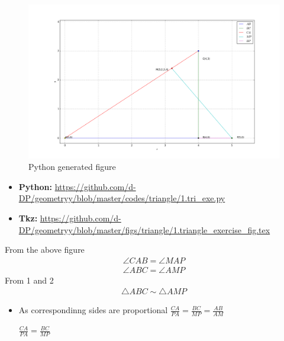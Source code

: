 \begin{frame}
\begin{figure}[!ht]
\resizebox{.5\linewidth}{!}
{

\includegraphics[scale=1.2]{./figs/triangle/tri.png}
}
\caption{Python generated figure}
\label{fig:foo}
\end{figure}
\begin{itemize}
\item \textbf{Python:} \url{https://github.com/d-DP/geometryy/blob/master/codes/triangle/1.tri_exe.py}
\item \textbf{Tkz:} \url{https://github.com/d-DP/geometryy/blob/master/figs/triangle/1.triangle_exercise_fig.tex}
\end{itemize}

\end{frame}
\begin{frame}
From the above figure
\begin{align}
	\angle{CAB} =\angle{MAP} \\
	\angle{ABC} = \angle{AMP}
\end{align}
From 1 and 2
\begin{align}
\triangle{ABC} \sim \triangle{AMP}
\end{align}
\begin{itemize}
\item As correspondinng sides are proportional
$\frac{CA}{PA}=\frac{BC}{MP}=\frac{AB}{AM}$

\begin{center}
$\frac{CA}{PA}=\frac{BC}{MP}$
\end{center}
\end{itemize}

\end{frame}